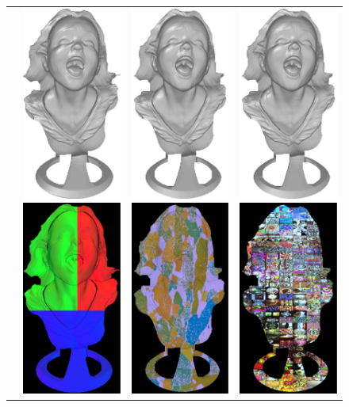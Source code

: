\begin{figure}
{\begin{tabular}{cccc}
\multirow{-15}{*}{\parbox[t]{2.5mm}{}} &   
 \includegraphics[height=0.25\linewidth]{figures/result/comp_robust_rgb_shape.pdf}
 \includegraphics[height=0.25\linewidth]{figures/result/comp_robust_rgb_albedo.pdf} &
 \includegraphics[height=0.25\linewidth]{figures/result/comp_robust_pattern_shape.pdf} 
\includegraphics[height=0.25\linewidth]{figures/result/comp_robust_pattern_albedo.pdf} &
\includegraphics[height=0.25\linewidth]{figures/result/comp_robust_love_shape.pdf} 
\includegraphics[height=0.25\linewidth]{figures/result/comp_robust_love_albedo.pdf} \\

\end{tabular}}
\end{figure}
